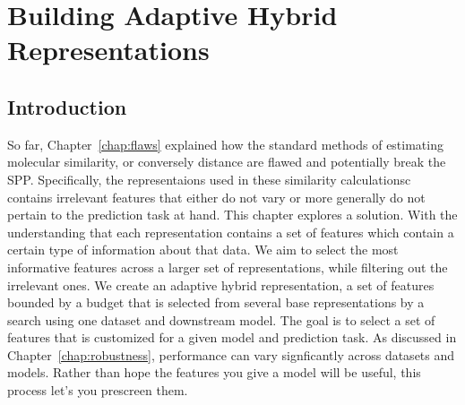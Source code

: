\chapter{Building Adaptive Hybrid Representations}\label{chap:method}


\section{Introduction}

So far, Chapter~\ref{chap:flaws} explained how the standard methods of estimating molecular similarity, or conversely distance are flawed and potentially break the SPP. Specifically, the representaions used in these similarity calculationsc contains irrelevant features that either do not vary or more generally do not pertain to the prediction task at hand. This chapter explores a solution. With the understanding that each representation contains a set of features which contain a certain type of information about that data. We aim to select the most informative features across a larger set of representations, while filtering out the irrelevant ones. We create an adaptive hybrid representation, a set of features bounded by a budget that is selected from several base representations by a search using one dataset and downstream model. The goal is to select a set of features that is customized for a given model and prediction task. As discussed in Chapter~\ref{chap:robustness}, performance can vary signficantly across datasets and models. Rather than hope the features you give a model will be useful, this process let's you prescreen them. 


